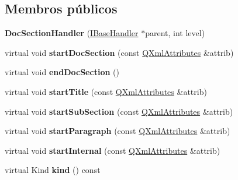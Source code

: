 \subsection*{Membros públicos}
\begin{DoxyCompactItemize}
\item 
\hypertarget{class_doc_section_handler_a47e1935cb5b57a9bd94eec34d4b38dcd}{{\bfseries Doc\-Section\-Handler} (\hyperlink{class_i_base_handler}{I\-Base\-Handler} $\ast$parent, int level)}\label{class_doc_section_handler_a47e1935cb5b57a9bd94eec34d4b38dcd}

\item 
\hypertarget{class_doc_section_handler_a0fa8ce98fd4e4f49362faacb168284b8}{virtual void {\bfseries start\-Doc\-Section} (const \hyperlink{class_q_xml_attributes}{Q\-Xml\-Attributes} \&attrib)}\label{class_doc_section_handler_a0fa8ce98fd4e4f49362faacb168284b8}

\item 
\hypertarget{class_doc_section_handler_a2638fc35f54646c3dea5d947c6cdd09d}{virtual void {\bfseries end\-Doc\-Section} ()}\label{class_doc_section_handler_a2638fc35f54646c3dea5d947c6cdd09d}

\item 
\hypertarget{class_doc_section_handler_a542aae01d1b2fae60d3c4dd0b77f6669}{virtual void {\bfseries start\-Title} (const \hyperlink{class_q_xml_attributes}{Q\-Xml\-Attributes} \&attrib)}\label{class_doc_section_handler_a542aae01d1b2fae60d3c4dd0b77f6669}

\item 
\hypertarget{class_doc_section_handler_a5a04b885f45ed0122118e983edbf83ca}{virtual void {\bfseries start\-Sub\-Section} (const \hyperlink{class_q_xml_attributes}{Q\-Xml\-Attributes} \&attrib)}\label{class_doc_section_handler_a5a04b885f45ed0122118e983edbf83ca}

\item 
\hypertarget{class_doc_section_handler_abb7f955561480002949ada58092c1964}{virtual void {\bfseries start\-Paragraph} (const \hyperlink{class_q_xml_attributes}{Q\-Xml\-Attributes} \&attrib)}\label{class_doc_section_handler_abb7f955561480002949ada58092c1964}

\item 
\hypertarget{class_doc_section_handler_ae252c8def30c9ccd26a72227211e309e}{virtual void {\bfseries start\-Internal} (const \hyperlink{class_q_xml_attributes}{Q\-Xml\-Attributes} \&attrib)}\label{class_doc_section_handler_ae252c8def30c9ccd26a72227211e309e}

\item 
\hypertarget{class_doc_section_handler_af8e62c8a81ddf2283205cc8955de50eb}{virtual Kind {\bfseries kind} () const }\label{class_doc_section_handler_af8e62c8a81ddf2283205cc8955de50eb}


\end{DoxyCompactItemize}
